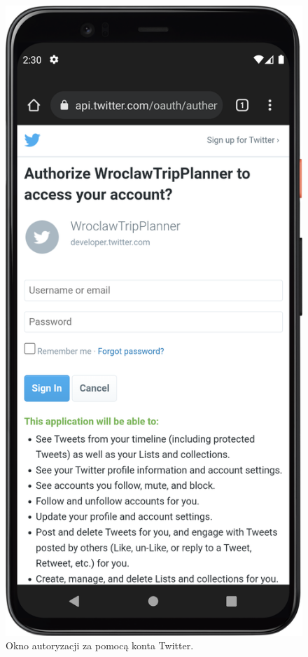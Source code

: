         \begin{figure}[!ht]%
            \centering
            \includegraphics[scale=0.14]{src/app/twitter_login.png}
            \caption{Okno autoryzacji za pomocą konta Twitter.\label{twitter}}
            \qquad
        \end{figure} 